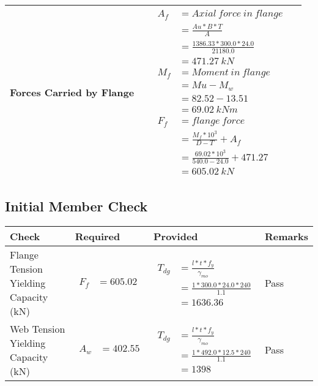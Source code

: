 \documentclass{article}%
\begin{document}
\begin{longtable}{|p{4cm}|p{3.5cm}|p{6.5cm}|p{1.5cm}|}
\hline%
Forces Carried by Flange&&$\begin{aligned} A_f&= Axial~force~ in ~flange  \\ &= \frac{Au * B *T}{A} \\ &= \frac{1386.33 * 300.0*24.0}{21180.0} \\ &=471.27~ kN\\ M_f& =Moment~ in~ flange \\  & = Mu-M_w\\ &= 82.52-13.51\\ &=69.02~{kNm}\\  F_f& =flange~force  \\ & = \frac{M_f *10^3}{D-T} + A_f \\ &= \frac{69.02* 10^3}{540.0-24.0} +471.27 \\ &=605.02~kN \end{aligned}$&\\%
\hline%
\end{longtable}

%
\newpage%
\subsection{Initial Member Check}%
\label{subsec:InitialMemberCheck}%
\renewcommand{\arraystretch}{1.2}%
\begin{longtable}{|p{3cm}|p{4.5cm}|p{6.5cm}|p{1.5cm}|}%
\hline%
\rowcolor{OsdagGreen}%
Check&Required&Provided&Remarks\\%
\hline%
\endhead%
\hline%
Flange Tension Yielding Capacity (kN)&$\begin{aligned} F_f &=605.02\end{aligned}$&$\begin{aligned} T_{dg} &= \frac{l*t*f_y}{\gamma_{mo}}\\ &=\frac{1*300.0*24.0*240}{1.1}\\ &=1636.36\end{aligned}$&Pass\\%
\hline%
Web Tension Yielding Capacity (kN)&$\begin{aligned} A_w &=402.55\end{aligned}$&$\begin{aligned} T_{dg} &= \frac{l*t*f_y}{\gamma_{mo}}\\ &=\frac{1*492.0*12.5*240}{1.1}\\ &=1398\end{aligned}$&Pass\\%
\hline%
\end{longtable}
\end{document}
